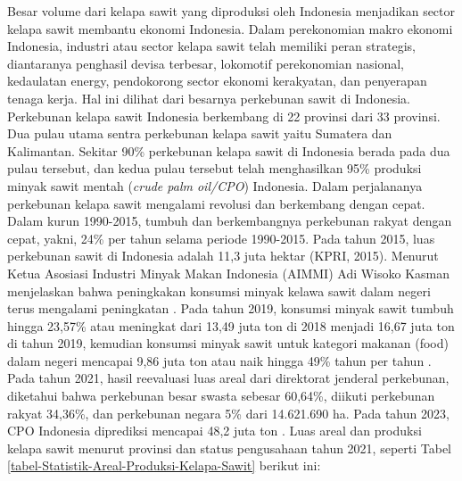 Besar volume dari kelapa sawit yang diproduksi oleh Indonesia menjadikan sector kelapa sawit membantu ekonomi Indonesia. Dalam perekonomian makro ekonomi Indonesia, industri atau sector kelapa sawit telah memiliki peran strategis, diantaranya penghasil devisa terbesar, lokomotif perekonomian nasional, kedaulatan energy, pendokorong sector ekonomi kerakyatan, dan penyerapan tenaga kerja. Hal ini dilihat dari besarnya perkebunan sawit di Indonesia. Perkebunan kelapa sawit Indonesia berkembang di 22 provinsi dari 33 provinsi. Dua pulau utama sentra perkebunan kelapa sawit yaitu Sumatera dan Kalimantan. Sekitar 90\% perkebunan kelapa sawit di Indonesia berada pada dua pulau tersebut, dan kedua pulau tersebut telah menghasilkan 95\% produksi minyak sawit mentah (\textit{crude palm oil/CPO}) Indonesia. Dalam perjalananya perkebunan kelapa sawit mengalami revolusi dan berkembang dengan cepat. Dalam kurun 1990-2015, tumbuh dan berkembangnya perkebunan rakyat dengan cepat, yakni, 24\% per tahun selama periode 1990-2015. Pada tahun 2015, luas perkebunan sawit di Indonesia adalah 11,3 juta hektar (KPRI, 2015)\citep{StatistikPerkebunanKelapaSawit2013-2015}. Menurut Ketua Asosiasi Industri Minyak Makan Indonesia (AIMMI) Adi Wisoko Kasman menjelaskan bahwa peningkakan konsumsi minyak kelawa sawit dalam negeri terus mengalami peningkatan \citep{GapkiCatatKonsumsiMinyakSawit}. Pada tahun 2019, konsumsi minyak sawit tumbuh hingga 23,57\% atau meningkat dari 13,49 juta ton di 2018 menjadi 16,67 juta ton di tahun 2019, kemudian konsumsi minyak sawit untuk kategori makanan (food) dalam negeri mencapai 9,86 juta ton atau naik hingga 49\% tahun per tahun \citep{EksporMinyakSawitKontanCoId}. Pada tahun 2021, hasil reevaluasi luas areal dari direktorat jenderal perkebunan, diketahui bahwa perkebunan besar swasta sebesar 60,64\%, diikuti perkebunan rakyat 34,36\%, dan perkebunan negara 5\% dari 14.621.690 ha. Pada tahun 2023, CPO Indonesia diprediksi mencapai 48,2 juta ton \citep{DItjenbun-2022-Statistik-Perkebunan-Unggulan}. Luas areal dan produksi kelapa sawit menurut provinsi dan status pengusahaan tahun 2021, seperti Tabel \ref{tabel-Statistik-Areal-Produksi-Kelapa-Sawit} berikut ini:

